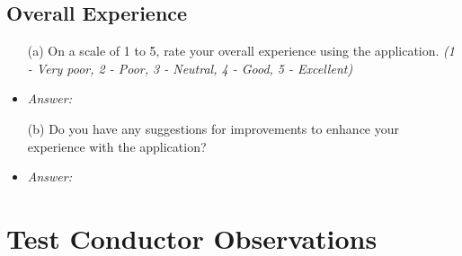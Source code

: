 \documentclass{article}
\begin{document}
\subsection*{\textbf{Overall Experience}}
  \begin{itemize}
    \item[(a)] On a scale of 1 to 5, rate your overall experience using the
    application. \textit{(1 - Very poor, 2 - Poor, 3 - Neutral, 4 - Good, 5 -
    Excellent)}
    \item \emph{Answer:}
    \item[(b)] Do you have any suggestions for improvements to enhance your
    experience with the application?
    \item \emph{Answer:}
  \end{itemize}

\section{Test Conductor Observations}
\end{document}
